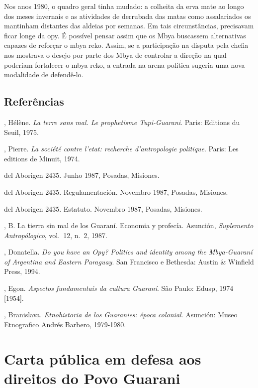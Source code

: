 {{Nos anos 1980, o quadro geral tinha mudado: a colheita da erva mate ao
longo dos meses invernais e as atividades de derrubada das matas como
assalariados os mantinham distantes das aldeias por semanas. Em tais
circunstâncias, precisavam ficar longe da opy. É possível pensar assim
que os Mbya buscassem alternativas capazes de reforçar o mbya reko.
Assim, se a participação na disputa pela chefia nos mostrava o desejo
por parte dos Mbya de controlar a direção na qual poderiam fortalecer o
mbya reko, a entrada na arena política sugeria uma nova modalidade de
defendê-lo. 

\section{Referências}

\begin{Parskip}
, Hélène. \emph{La terre sans mal. Le prophetisme Tupi-Guarani}. Paris:
Editions du Seuil, 1975.

, Pierre. \emph{La société contre l’etat: recherche d’antropologie
politique}. Paris: Les editions de Minuit, 1974.

 del Aborigen 2435. Junho 1987, Posadas, Misiones.

 del Aborigen 2435. Regulamentación. Novembro 1987, Posadas,
Misiones.

 del Aborigen 2435. Estatuto. Novembro 1987, Posadas, Misiones.

, B. La tierra sin mal de los Guaraní. Economia y profecía.
Asunción, \emph{Suplemento Antropólogico}, vol.~12, n.~2, 1987.

, Donatella. \emph{Do you have an Opy? Politics and identity among the
Mbya-Guaraní of Argentina and Eastern Paraguay}. San Francisco e
Bethesda: Austin \& Winfield Press, 1994.

, Egon. \emph{Aspectos fundamentais da cultura Guaraní}. São Paulo:
Edusp, 1974 [1954].

, Branislava. \emph{Etnohistoria de los Guaranies: época colonial}.
Asunción: Museo Etnografico Andrés Barbero, 1979-1980.
\end{Parskip}

\chapter{Carta pública em defesa aos direitos do Povo Guarani}

}}
